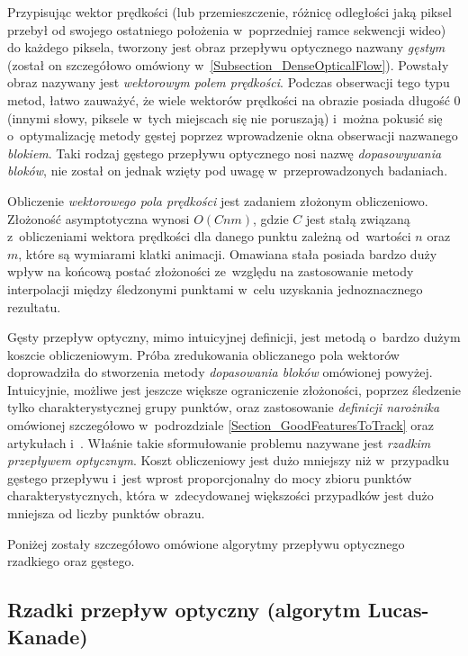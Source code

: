       Przypisując wektor prędkości (lub przemieszczenie, różnicę odległości jaką piksel przebył od swojego ostatniego położenia w~poprzedniej ramce sekwencji wideo) do każdego piksela, tworzony jest obraz przepływu optycznego nazwany \textit{gęstym} (został on szczegółowo omówiony w~\ref{Subsection_DenseOpticalFlow}). Powstały obraz nazywany jest \textit{wektorowym polem prędkości}. Podczas obserwacji tego typu metod, łatwo zauważyć, że wiele wektorów prędkości na obrazie posiada długość $0$ (innymi słowy, piksele w~tych miejscach się nie poruszają) i~można pokusić się o~optymalizację metody gęstej poprzez wprowadzenie okna obserwacji nazwanego \textit{blokiem}. Taki rodzaj gęstego przepływu optycznego nosi nazwę \textit{dopasowywania bloków}, nie został on jednak wzięty pod uwagę w~przeprowadzonych badaniach.

      Obliczenie \textit{wektorowego pola prędkości} jest zadaniem złożonym obliczeniowo. Złożoność asymptotyczna wynosi $O(Cnm)$, gdzie $C$ jest stałą związaną z~obliczeniami wektora prędkości dla danego punktu zależną od~wartości $n$ oraz~$m$, które są wymiarami klatki animacji. Omawiana stała posiada bardzo duży wpływ na końcową postać złożoności ze~względu na zastosowanie metody interpolacji między śledzonymi punktami w~celu uzyskania jednoznacznego rezultatu.

      Gęsty przepływ optyczny, mimo intuicyjnej definicji, jest metodą o~bardzo dużym koszcie obliczeniowym. Próba zredukowania obliczanego pola wektorów doprowadziła do stworzenia metody \textit{dopasowania bloków} omówionej powyżej. Intuicyjnie, możliwe jest jeszcze większe ograniczenie złożoności, poprzez śledzenie tylko charakterystycznej grupy punktów, oraz zastosowanie \textit{definicji narożnika} omówionej szczegółowo w~podrozdziale \ref{Section_GoodFeaturesToTrack} oraz artykułach \cite{LucasKanadeTracker81} i~\cite{GoodFeaturesToTrack94}. Właśnie takie sformułowanie problemu nazywane jest \textit{rzadkim przepływem optycznym}. Koszt obliczeniowy jest dużo mniejszy niż w~przypadku gęstego przepływu i~jest wprost proporcjonalny do mocy zbioru punktów charakterystycznych, która w~zdecydowanej większości przypadków jest dużo mniejsza od liczby punktów obrazu.

      Poniżej zostały szczegółowo omówione algorytmy przepływu optycznego rzadkiego oraz gęstego.

    \subsection{Rzadki przepływ optyczny (algorytm Lucas-Kanade)}

